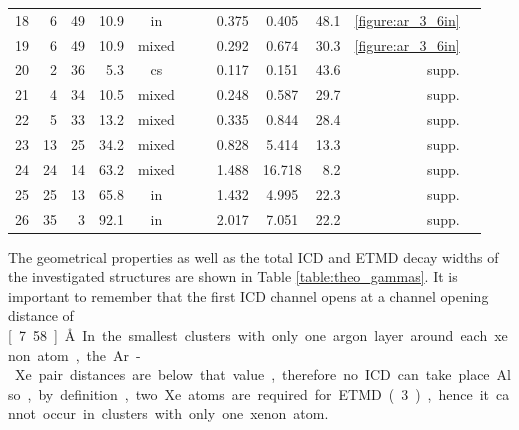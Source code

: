 \begin{table}[H]
\begin{tabular}{rrrrcccccrrr}
18 &     6 &    49 & 10.9  & in    &         &          & 0.375 & 0.405 &  48.1& \ref{figure:ar_3_6in}\\ %
19 &     6 &    49 & 10.9  & mixed &         &          & 0.292 & 0.674 &  30.3& \ref{figure:ar_3_6in}\\ %
                                                                                                 \midrule
20 &     2 &    36 &  5.3  & cs    &         &          & 0.117 & 0.151 &  43.6& supp.\\                        %
21 &     4 &    34 & 10.5  & mixed &         &          & 0.248 & 0.587 &  29.7& supp.\\                        %
22 &     5 &    33 & 13.2  & mixed &         &          & 0.335 & 0.844 &  28.4& supp.\\                        %
23 &    13 &    25 & 34.2  & mixed &         &          & 0.828 & 5.414 &  13.3& supp.\\                        %
24 &    24 &    14 & 63.2  & mixed &         &          & 1.488 &16.718 &   8.2& supp.\\                        %
25 &    25 &    13 & 65.8  & in    &         &          & 1.432 & 4.995 &  22.3& supp.\\                        %
26 &    35 &     3 & 92.1  & in    &         &          & 2.017 & 7.051 &  22.2& supp.\\                        %
\bottomrule
\end{tabular}
\end{table}
%
The geometrical properties as well as the total ICD and ETMD decay widths
of the investigated structures are shown in Table \ref{table:theo_gammas}.
It is important to remember that the first ICD channel opens at a
channel opening distance of \unit[7.58]{\AA}. In the smallest
clusters with only one argon layer around each
xenon atom, the Ar-Xe pair distances are below that value, therefore 
no ICD can take place. Also, by definition, two Xe atoms are
required for ETMD(3), hence it cannot occur in clusters with only one xenon atom.
%
